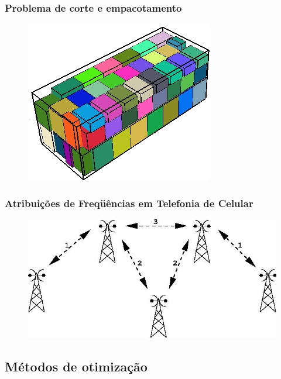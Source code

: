 \documentclass[xcolor=dvipsnames]{beamer}
\begin{document}
\begin{frame}%
\frametitle{Problema de corte e empacotamento}
\begin{figure}
\centering
\includegraphics[scale=0.5]{img/empacotamento.jpg}
\end{figure}
\end{frame}%


\begin{frame}%
\frametitle{Atribuições de Freqüências em Telefonia de Celular}
\begin{figure}
\centering
\includegraphics[scale=0.5]{img/frequencia.jpg}
\end{figure}
\end{frame}%

\subsection{Métodos de otimização}
\end{document}

